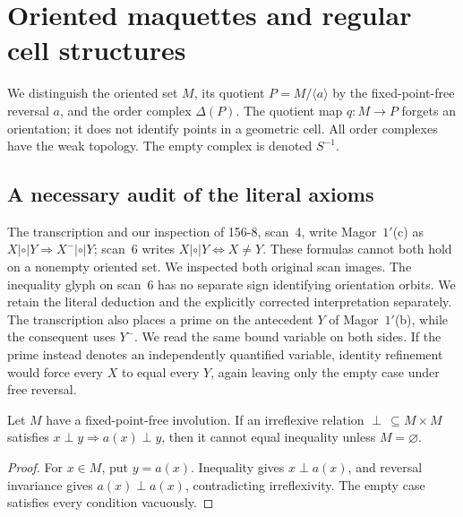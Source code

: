 \section{Oriented maquettes and regular cell structures}
\label{sec:maquettes}

We distinguish the oriented set $M$, its quotient $P=M/\langle a\rangle$
by the fixed-point-free reversal $a$, and the order complex $\Delta(P)$.
The quotient map $q:M\to P$ forgets an orientation; it does not identify
points in a geometric cell. All order complexes have the weak topology.
The empty complex is denoted $S^{-1}$.

\subsection{A necessary audit of the literal axioms}

The transcription and our inspection of 156-8, scan~4, write Magor~$1'$(c) as
$X\mathrel{|\circ|}Y\Rightarrow X^-\mathrel{|\circ|}Y$;
scan~6 writes $X\mathrel{|\circ|}Y\Longleftrightarrow X\ne Y$.
These formulas cannot both hold on a nonempty oriented set.
We inspected both original scan images. The inequality glyph on scan~6
has no separate sign identifying orientation orbits. We retain the
literal deduction and the explicitly corrected interpretation separately.
The transcription also places a prime on the antecedent $Y$ of
Magor~$1'$(b), while the consequent uses $Y^-$. We read the same bound
variable on both sides. If the prime instead denotes an independently
quantified variable, identity refinement would force every $X$ to
equal every $Y$, again leaving only the empty case under free reversal.

\begin{theorem}\label{SA21-C01}
Let $M$ have a fixed-point-free involution. If an irreflexive relation
$\perp\,\subseteq M\times M$ satisfies
$x\perp y\Rightarrow a(x)\perp y$, then it cannot equal inequality
unless $M=\varnothing$.
\end{theorem}
\begin{proof}
For $x\in M$, put $y=a(x)$. Inequality gives $x\perp a(x)$,
and reversal invariance gives $a(x)\perp a(x)$, contradicting
irreflexivity. The empty case satisfies every condition vacuously.
\end{proof}

